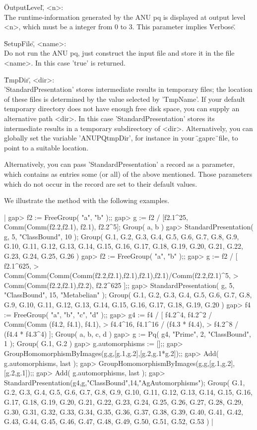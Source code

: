 \"OutputLevel\", <n>: \\
    The  runtime-information generated  by  the  ANU pq is  displayed  at
    output level  <n>, which  must  be  a integer  from  0  to  3.   This
    parameter implies \"Verbose\".

\"SetupFile\", <name>: \\
    Do not run the ANU pq, just construct the input file and  store it in
    the file <name>. In this case 'true' is returned.

\"TmpDir\", <dir>: \\
    'StandardPresentation'  stores  intermediate  results  in   temporary
    files;  the location  of  these  files  is  determined by  the  value
    selected by 'TmpName'.  If your default  temporary directory does not
    have enough  free  disk  space,  you  can supply an  alternative path
    <dir>.  In this case  'StandardPresentation' stores its  intermediate
    results in a temporary subdirectory of <dir>.  Alternatively, you can
    globally  set  the  variable  'ANUPQtmpDir',  for  instance  in  your
    \".gaprc\"\ file, to point to a suitable location.

Alternatively,  you  can  pass   'StandardPresentation'  a  record  as  a
parameter,  which  contains  as  entries  some  (or  all)  of  the  above
mentioned.  Those parameters which do not occur in the record are set  to
their default values.

We illustrate the method with the following examples.

|    gap> f2 := FreeGroup( "a", "b" );;
    gap> g := f2 / [f2.1^25, Comm(Comm(f2.2,f2.1), f2.1), f2.2^5];
    Group( a, b )
    gap> StandardPresentation( g, 5, "ClassBound", 10 );
    Group( G.1, G.2, G.3, G.4, G.5, G.6, G.7, G.8, G.9, G.10, G.11, G.12,
    G.13, G.14, G.15, G.16, G.17, G.18, G.19, G.20, G.21, G.22, G.23,
    G.24, G.25, G.26 )
    gap> f2 := FreeGroup( "a", "b" );;
    gap> g := f2 / [ f2.1^625,
    >  Comm(Comm(Comm(Comm(f2.2,f2.1),f2.1),f2.1),f2.1)/Comm(f2.2,f2.1)^5,
    >  Comm(Comm(f2.2,f2.1),f2.2), f2.2^625 ];;
    gap> StandardPresentation( g, 5, "ClassBound", 15, "Metabelian" );
    Group( G.1, G.2, G.3, G.4, G.5, G.6, G.7, G.8, G.9, G.10, G.11, G.12,
    G.13, G.14, G.15, G.16, G.17, G.18, G.19, G.20 )
    gap> f4 := FreeGroup( "a", "b", "c", "d" );;
    gap> g4 := f4 / [ f4.2^4, f4.2^2 / Comm(Comm (f4.2, f4.1), f4.1),
    >                f4.4^16, f4.1^16 / (f4.3 * f4.4),
    >                f4.2^8 / (f4.4 * f4.3^4) ];
    Group( a, b, c, d )
    gap> g := Pq( g4, "Prime", 2, "ClassBound", 1 );
    Group( G.1, G.2 )
    gap> g.automorphisms := [];;
    gap> GroupHomomorphismByImages(g,g,[g.1,g.2],[g.2,g.1*g.2]);;
    gap> Add( g.automorphisms, last );
    gap> GroupHomomorphismByImages(g,g,[g.1,g.2],[g.2,g.1]);;
    gap> Add( g.automorphisms, last );
    gap> StandardPresentation(g4,g,"ClassBound",14,"AgAutomorphisms");
    Group( G.1, G.2, G.3, G.4, G.5, G.6, G.7, G.8, G.9, G.10, G.11, G.12,
    G.13, G.14, G.15, G.16, G.17, G.18, G.19, G.20, G.21, G.22, G.23,
    G.24, G.25, G.26, G.27, G.28, G.29, G.30, G.31, G.32, G.33, G.34,
    G.35, G.36, G.37, G.38, G.39, G.40, G.41, G.42, G.43, G.44, G.45,
    G.46, G.47, G.48, G.49, G.50, G.51, G.52, G.53 ) |

